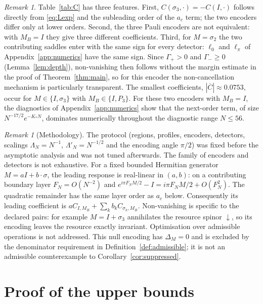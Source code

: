 \documentclass[11pt]{amsart}
\theoremstyle{definition}
\theoremstyle{remark}
\newtheorem{remark}[theorem]{Remark}
\newcommand{\dn}{{\downarrow}}
\begin{document}
\begin{remark}\label{rem:features}
Table~\ref{tab:C} has three features. First,
$C(\sigma_3,\cdot)=-C(I,\cdot)$ follows directly from
\eqref{eq:Lexp} and the subleading order of the $a_c$ term;
the two encoders differ only at lower orders.  Second, the three Pauli
encoders are not equivalent: with $M_B=I$ they give three different
coefficients.  Third, for $M=\sigma_2$ the two contributing saddles enter with
the same sign for every detector: $\ell_0$ and $\ell_\pi$ of
Appendix~\ref{app:numerics} have the same sign.  Since $\Gamma_+>0$ and
$\Gamma_-\ge0$ (Lemma~\ref{lem:depth}), non-vanishing then follows without
the margin estimate in the proof of Theorem~\ref{thm:main}, so for this
encoder the non-cancellation mechanism is particularly transparent.  The smallest coefficients,
$|\overline C|\approx0.0753$, occur for $M\in\{I,\sigma_3\}$ with
$M_B\in\{I,P_3\}$.  For these two encoders with $M_B=I$, the diagnostics of
Appendix~\ref{app:numerics} show that the next-order term, of size
$N^{-17/2}e^{-K_*N}$, dominates numerically throughout the diagnostic range
$N\le56$.
\end{remark}

\begin{remark}[Methodology]
The protocol (regions, profiles, encoders, detectors, scalings
$\Lambda_N=N^{-1}$, $\Lambda'_N=N^{-1/2}$ and the encoding angle $\pi/2$) was fixed before
the asymptotic analysis and was not tuned afterwards.  The family of
encoders and detectors is not exhaustive. For a fixed bounded Hermitian
generator $M=aI+b\cdot\sigma$, the leading response is real-linear in
$(a,b)$: on a contributing boundary layer $F_N=O(N^{-2})$ and
$e^{i\pi F_NM/2}-I=i\pi F_NM/2+O(F_N^2)$.
The quadratic remainder has the same layer order as $a_c$ below.
Consequently its leading coefficient is
$aC_{I,M_B}+\sum_k b_k C_{\sigma_k,M_B}$.
Non-vanishing is specific to the declared pairs: for example
$M=I+\sigma_3$ annihilates the resource spinor $\dn$, so its encoding
leaves the resource exactly invariant. Optimisation over admissible
operations is not addressed.
This null encoding has $\Delta_M=0$ and is excluded by the denominator
requirement in Definition~\ref{def:admissible}; it is not an admissible
counterexample to Corollary~\ref{cor:suppressed}.
\end{remark}

\section{Proof of the upper bounds}\label{sec:upper}
\end{document}
